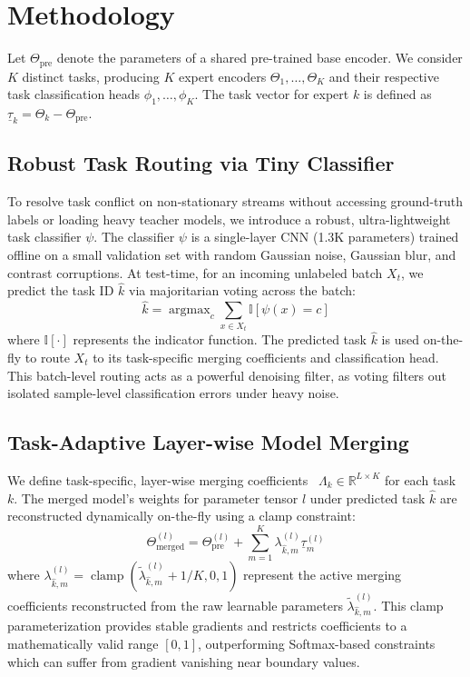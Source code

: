 \documentclass{article}
\theoremstyle{plain}
\theoremstyle{definition}
\theoremstyle{remark}
\begin{document}
\section{Methodology}
Let $\Theta_{\text{pre}}$ denote the parameters of a shared pre-trained base encoder. We consider $K$ distinct tasks, producing $K$ expert encoders $\Theta_1, \dots, \Theta_K$ and their respective task classification heads $\phi_1, \dots, \phi_K$. The task vector for expert $k$ is defined as $\underline{\tau}_k = \Theta_k - \Theta_{\text{pre}}$.

\subsection{Robust Task Routing via Tiny Classifier}
To resolve task conflict on non-stationary streams without accessing ground-truth labels or loading heavy teacher models, we introduce a robust, ultra-lightweight task classifier $\psi$. The classifier $\psi$ is a single-layer CNN (1.3K parameters) trained offline on a small validation set with random Gaussian noise, Gaussian blur, and contrast corruptions. At test-time, for an incoming unlabeled batch $X_t$, we predict the task ID $\hat{k}$ via majoritarian voting across the batch:
\begin{equation}
    \hat{k} = \operatorname{argmax}_{c} \sum_{x \in X_t} \mathbb{I}[\psi(x) = c]
\end{equation}
where $\mathbb{I}[\cdot]$ represents the indicator function. The predicted task $\hat{k}$ is used on-the-fly to route $X_t$ to its task-specific merging coefficients and classification head. This batch-level routing acts as a powerful denoising filter, as voting filters out isolated sample-level classification errors under heavy noise.

\subsection{Task-Adaptive Layer-wise Model Merging}
We define task-specific, layer-wise merging coefficients \, $\Lambda_k \in \mathbb{R}^{L \times K}$ for each task $k$. The merged model's weights for parameter tensor $l$ under predicted task $\hat{k}$ are reconstructed dynamically on-the-fly using a clamp constraint:
\begin{equation}
    \Theta_{\text{merged}}^{(l)} = \Theta_{\text{pre}}^{(l)} + \sum_{m=1}^K \lambda_{\hat{k}, m}^{(l)} \underline{\tau}_m^{(l)}
\end{equation}
where $\lambda_{\hat{k}, m}^{(l)} = \operatorname{clamp}(\tilde{\lambda}_{\hat{k}, m}^{(l)} + 1/K, 0, 1)$ represent the active merging coefficients reconstructed from the raw learnable parameters $\tilde{\lambda}_{\hat{k}, m}^{(l)}$. This clamp parameterization provides stable gradients and restricts coefficients to a mathematically valid range $[0, 1]$, outperforming Softmax-based constraints which can suffer from gradient vanishing near boundary values.
\end{document}
